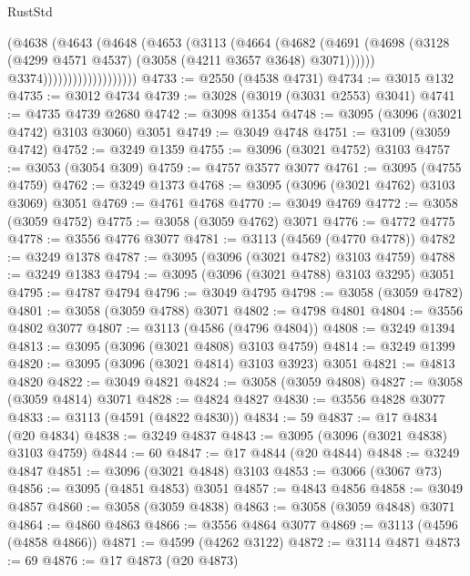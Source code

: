 \begin{lexlean}{RustStd}
\begin{coremodule}
                                (@4638
                                  (@4643
                                    (@4648
                                      (@4653
                                        (@3113
                                          (@4664
                                            (@4682
                                              (@4691
                                                (@4698
                                                  (@3128
                                                    (@4299 @4571 @4537)
                                                    (@3058 (@4211 @3657 @3648) @3071))))))
                                          @3374)))))))))))))))))))
@4733 := @2550 (@4538 @4731)
@4734 := @3015 @132
@4735 := @3012 @4734
@4739 := @3028 (@3019 (@3031 @2553) @3041)
@4741 := @4735 @4739 @2680
@4742 := @3098 @1354
@4748 := @3095 (@3096 (@3021 @4742) @3103 @3060) @3051
@4749 := @3049 @4748
@4751 := @3109 (@3059 @4742)
@4752 := @3249 @1359
@4755 := @3096 (@3021 @4752) @3103
@4757 := @3053 (@3054 @309)
@4759 := @4757 @3577 @3077
@4761 := @3095 (@4755 @4759)
@4762 := @3249 @1373
@4768 := @3095 (@3096 (@3021 @4762) @3103 @3069) @3051
@4769 := @4761 @4768
@4770 := @3049 @4769
@4772 := @3058 (@3059 @4752)
@4775 := @3058 (@3059 @4762) @3071
@4776 := @4772 @4775
@4778 := @3556 @4776 @3077
@4781 := @3113 (@4569 (@4770 @4778))
@4782 := @3249 @1378
@4787 := @3095 (@3096 (@3021 @4782) @3103 @4759)
@4788 := @3249 @1383
@4794 := @3095 (@3096 (@3021 @4788) @3103 @3295) @3051
@4795 := @4787 @4794
@4796 := @3049 @4795
@4798 := @3058 (@3059 @4782)
@4801 := @3058 (@3059 @4788) @3071
@4802 := @4798 @4801
@4804 := @3556 @4802 @3077
@4807 := @3113 (@4586 (@4796 @4804))
@4808 := @3249 @1394
@4813 := @3095 (@3096 (@3021 @4808) @3103 @4759)
@4814 := @3249 @1399
@4820 := @3095 (@3096 (@3021 @4814) @3103 @3923) @3051
@4821 := @4813 @4820
@4822 := @3049 @4821
@4824 := @3058 (@3059 @4808)
@4827 := @3058 (@3059 @4814) @3071
@4828 := @4824 @4827
@4830 := @3556 @4828 @3077
@4833 := @3113 (@4591 (@4822 @4830))
@4834 := 59
@4837 := @17 @4834 (@20 @4834)
@4838 := @3249 @4837
@4843 := @3095 (@3096 (@3021 @4838) @3103 @4759)
@4844 := 60
@4847 := @17 @4844 (@20 @4844)
@4848 := @3249 @4847
@4851 := @3096 (@3021 @4848) @3103
@4853 := @3066 (@3067 @73)
@4856 := @3095 (@4851 @4853) @3051
@4857 := @4843 @4856
@4858 := @3049 @4857
@4860 := @3058 (@3059 @4838)
@4863 := @3058 (@3059 @4848) @3071
@4864 := @4860 @4863
@4866 := @3556 @4864 @3077
@4869 := @3113 (@4596 (@4858 @4866))
@4871 := @4599 (@4262 @3122)
@4872 := @3114 @4871
@4873 := 69
@4876 := @17 @4873 (@20 @4873)

\end{coremodule}
\end{lexlean}
